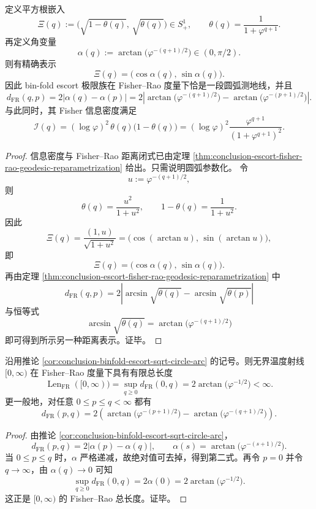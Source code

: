 \begin{corollary}[平方根嵌入下的精确圆弧参数化]\label{cor:conclusion-binfold-escort-sqrt-circle-arc}
定义平方根嵌入
\[
\Xi(q):=
\bigl(\sqrt{1-\theta(q)},\,\sqrt{\theta(q)}\bigr)\in S^1_+,
\qquad
\theta(q)=\frac{1}{1+\varphi^{q+1}}.
\]
再定义角变量
\[
\alpha(q):=\arctan\!\bigl(\varphi^{-(q+1)/2}\bigr)\in(0,\pi/2).
\]
则有精确表示
\[
\Xi(q)=\bigl(\cos\alpha(q),\,\sin\alpha(q)\bigr).
\]
因此 bin-fold escort 极限族在 Fisher--Rao 度量下恰是一段圆弧测地线，并且
\[
d_{\mathrm{FR}}(q,p)
=
2\bigl|\alpha(q)-\alpha(p)\bigr|
=
2\left|
\arctan\!\bigl(\varphi^{-(q+1)/2}\bigr)
-
\arctan\!\bigl(\varphi^{-(p+1)/2}\bigr)
\right|.
\]
与此同时，其 Fisher 信息密度满足
\[
\mathcal I(q)
=
(\log\varphi)^2\,\theta(q)\bigl(1-\theta(q)\bigr)
=
(\log\varphi)^2\frac{\varphi^{q+1}}{(1+\varphi^{q+1})^2}.
\]
\end{corollary}
\begin{proof}
信息密度与 Fisher--Rao 距离闭式已由定理 \ref{thm:conclusion-escort-fisher-rao-geodesic-reparametrization} 给出。只需说明圆弧参数化。
令
\[
u:=\varphi^{-(q+1)/2},
\]
则
\[
\theta(q)=\frac{u^2}{1+u^2},
\qquad
1-\theta(q)=\frac{1}{1+u^2}.
\]
因此
\[
\Xi(q)=\frac{(1,u)}{\sqrt{1+u^2}}
=
\bigl(\cos(\arctan u),\,\sin(\arctan u)\bigr),
\]
即
\[
\Xi(q)=\bigl(\cos\alpha(q),\,\sin\alpha(q)\bigr).
\]
再由定理 \ref{thm:conclusion-escort-fisher-rao-geodesic-reparametrization} 中
\[
d_{\mathrm{FR}}(q,p)
=
2\left|
\arcsin\sqrt{\theta(q)}-\arcsin\sqrt{\theta(p)}
\right|
\]
与恒等式
\[
\arcsin\sqrt{\theta(q)}=\arctan\!\bigl(\varphi^{-(q+1)/2}\bigr)
\]
即可得到所示另一种距离表示。证毕。
\end{proof}

\begin{corollary}\label{cor:conclusion-binfold-escort-fisher-finite-diameter}
沿用推论 \ref{cor:conclusion-binfold-escort-sqrt-circle-arc} 的记号。则无界温度射线 \([0,\infty)\) 在 Fisher--Rao 度量下具有有限总长度
\[
\operatorname{Len}_{\mathrm{FR}}([0,\infty))
=
\sup_{q\ge 0}d_{\mathrm{FR}}(0,q)
=
2\arctan\!\bigl(\varphi^{-1/2}\bigr)
<\infty.
\]
更一般地，对任意 \(0\le p\le q<\infty\) 都有
\[
d_{\mathrm{FR}}(p,q)
=
2\left(
\arctan\!\bigl(\varphi^{-(p+1)/2}\bigr)
-\arctan\!\bigl(\varphi^{-(q+1)/2}\bigr)
\right).
\]
\end{corollary}
\begin{proof}
由推论 \ref{cor:conclusion-binfold-escort-sqrt-circle-arc}，
\[
d_{\mathrm{FR}}(p,q)
=
2\bigl|\alpha(p)-\alpha(q)\bigr|,
\qquad
\alpha(s)=\arctan\!\bigl(\varphi^{-(s+1)/2}\bigr).
\]
当 \(0\le p\le q\) 时，\(\alpha\) 严格递减，故绝对值可去掉，得到第二式。再令 \(p=0\) 并令 \(q\to\infty\)，由 \(\alpha(q)\to 0\) 可知
\[
\sup_{q\ge 0}d_{\mathrm{FR}}(0,q)=2\alpha(0)=2\arctan\!\bigl(\varphi^{-1/2}\bigr).
\]
这正是 \([0,\infty)\) 的 Fisher--Rao 总长度。证毕。
\end{proof}

